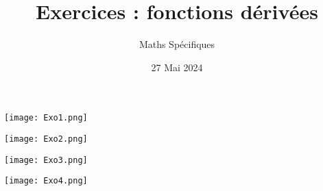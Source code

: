 \documentclass{article}
\title{Exercices : fonctions dérivées}
\date{27 Mai 2024}
\author{Maths Spécifiques}
\begin{document}
\pagestyle{empty}
\begin{center}
\texttt{[image: Exo1.png]}

\texttt{[image: Exo2.png]}

\texttt{[image: Exo3.png]}

\texttt{[image: Exo4.png]}
\end{center}
\end{document}
